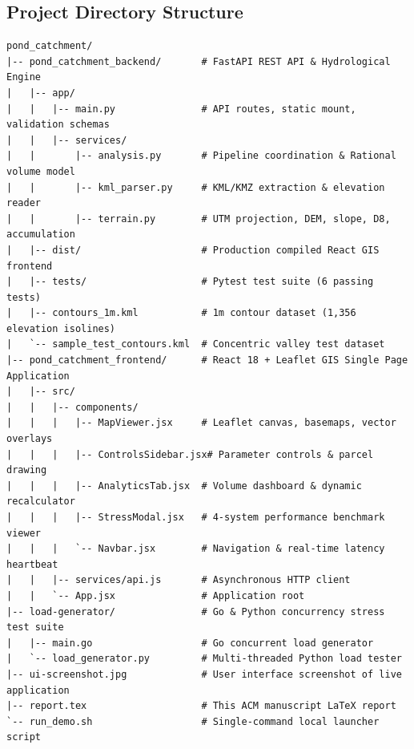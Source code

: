 \documentclass[manuscript,screen,review]{acmart}
\begin{document}
\subsection{Project Directory Structure}
\begin{verbatim}
pond_catchment/
|-- pond_catchment_backend/       # FastAPI REST API & Hydrological Engine
|   |-- app/
|   |   |-- main.py               # API routes, static mount, validation schemas
|   |   |-- services/
|   |       |-- analysis.py       # Pipeline coordination & Rational volume model
|   |       |-- kml_parser.py     # KML/KMZ extraction & elevation reader
|   |       |-- terrain.py        # UTM projection, DEM, slope, D8, accumulation
|   |-- dist/                     # Production compiled React GIS frontend
|   |-- tests/                    # Pytest test suite (6 passing tests)
|   |-- contours_1m.kml           # 1m contour dataset (1,356 elevation isolines)
|   `-- sample_test_contours.kml  # Concentric valley test dataset
|-- pond_catchment_frontend/      # React 18 + Leaflet GIS Single Page Application
|   |-- src/
|   |   |-- components/
|   |   |   |-- MapViewer.jsx     # Leaflet canvas, basemaps, vector overlays
|   |   |   |-- ControlsSidebar.jsx# Parameter controls & parcel drawing
|   |   |   |-- AnalyticsTab.jsx  # Volume dashboard & dynamic recalculator
|   |   |   |-- StressModal.jsx   # 4-system performance benchmark viewer
|   |   |   `-- Navbar.jsx        # Navigation & real-time latency heartbeat
|   |   |-- services/api.js       # Asynchronous HTTP client
|   |   `-- App.jsx               # Application root
|-- load-generator/               # Go & Python concurrency stress test suite
|   |-- main.go                   # Go concurrent load generator
|   `-- load_generator.py         # Multi-threaded Python load tester
|-- ui-screenshot.jpg             # User interface screenshot of live application
|-- report.tex                    # This ACM manuscript LaTeX report
`-- run_demo.sh                   # Single-command local launcher script
\end{verbatim}
\end{document}
